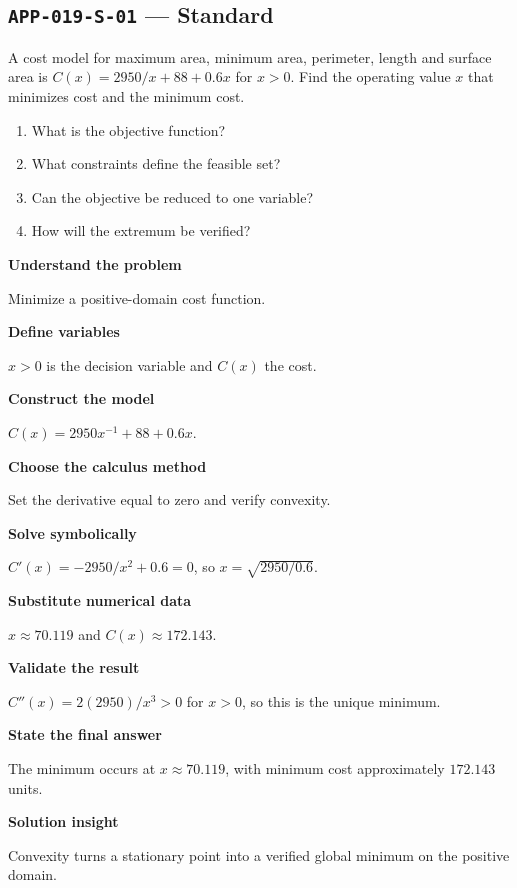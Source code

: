 \documentclass[11pt]{book}
\newcommand{\pid}[1]{\texttt{#1}}
\begin{document}
\subsection*{\pid{APP-019-S-01} — Standard}
\begin{problembox}
A cost model for maximum area, minimum area, perimeter, length and surface area is $C(x)=2950/x+88+0.6x$ for $x>0$. Find the operating value $x$ that minimizes cost and the minimum cost.
\end{problembox}
\begin{promptbox}\begin{enumerate}
\item What is the objective function?
\item What constraints define the feasible set?
\item Can the objective be reduced to one variable?
\item How will the extremum be verified?
\end{enumerate}\end{promptbox}
\begin{solutionbox}
\textbf{Understand the problem}\par Minimize a positive-domain cost function.\par\medskip
\textbf{Define variables}\par $x>0$ is the decision variable and $C(x)$ the cost.\par\medskip
\textbf{Construct the model}\par $C(x)=2950x^{-1}+88+0.6x$.\par\medskip
\textbf{Choose the calculus method}\par Set the derivative equal to zero and verify convexity.\par\medskip
\textbf{Solve symbolically}\par $C'(x)=-2950/x^2+0.6=0$, so $x=\sqrt{2950/0.6}$.\par\medskip
\textbf{Substitute numerical data}\par $x\approx 70.119$ and $C(x)\approx 172.143$.\par\medskip
\textbf{Validate the result}\par $C''(x)=2(2950)/x^3>0$ for $x>0$, so this is the unique minimum.\par\medskip
\textbf{State the final answer}\par The minimum occurs at $x\approx 70.119$, with minimum cost approximately $172.143$ units.\par\medskip
\textbf{Solution insight}\par Convexity turns a stationary point into a verified global minimum on the positive domain.\par\medskip
\end{solutionbox}
\end{document}
